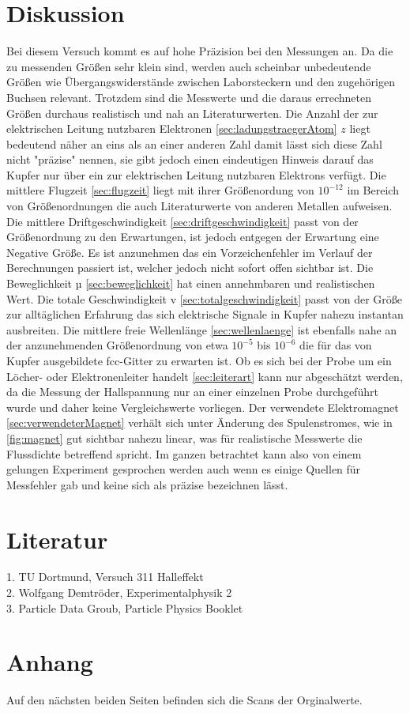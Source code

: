 \section{Diskussion}
\label{Diskussion}
Bei diesem Versuch kommt es auf hohe Präzision bei den Messungen an. Da die zu messenden Größen sehr 
klein sind, werden auch scheinbar unbedeutende Größen wie Übergangswiderstände zwischen Laborsteckern
und den zugehörigen Buchsen relevant. Trotzdem sind die Messwerte und die daraus errechneten Größen durchaus
realistisch und nah an Literaturwerten. Die Anzahl der zur elektrischen Leitung nutzbaren Elektronen 
\autoref{sec:ladungstraegerAtom} $z$ liegt bedeutend näher an eins als an einer anderen Zahl damit lässt 
sich diese Zahl nicht "präzise" nennen, sie gibt jedoch einen eindeutigen Hinweis darauf das Kupfer nur 
über ein zur elektrischen Leitung nutzbaren Elektrons verfügt. Die mittlere Flugzeit \autoref{sec:flugzeit}
liegt mit ihrer Größenordung von $10^{-12}$ im Bereich von Größenordnungen die auch Literaturwerte von 
anderen Metallen aufweisen. Die mittlere Driftgeschwindigkeit \autoref{sec:driftgeschwindigkeit} passt 
von der Größenordnung zu den Erwartungen, ist jedoch entgegen der Erwartung eine Negative Größe. Es ist 
anzunehmen das ein Vorzeichenfehler im Verlauf der Berechnungen passiert ist, welcher jedoch nicht sofort
offen sichtbar ist. Die Beweglichkeit µ \autoref{sec:beweglichkeit} hat einen annehmbaren und realistischen
Wert. Die totale Geschwindigkeit v \autoref{sec:totalgeschwindigkeit} passt von der Größe zur alltäglichen 
Erfahrung das sich elektrische Signale in Kupfer nahezu instantan ausbreiten. Die mittlere freie Wellenlänge
\autoref{sec:wellenlaenge} ist ebenfalls nahe an der anzunehmenden Größenordnung von etwa $10^{-5}$ bis 
$10^{-6}$ die für das von Kupfer ausgebildete fcc-Gitter zu erwarten ist. Ob es sich bei der Probe um ein
Löcher- oder Elektronenleiter handelt \autoref{sec:leiterart} kann nur abgeschätzt werden, da die Messung 
der Hallspannung nur an einer einzelnen Probe durchgeführt wurde und daher keine Vergleichswerte vorliegen.
Der verwendete Elektromagnet \autoref{sec:verwendeterMagnet} verhält sich unter Änderung des Spulenstromes, 
wie in \autoref{fig:magnet} gut sichtbar nahezu linear, was für realistische Messwerte die Flussdichte 
betreffend spricht. Im ganzen betrachtet kann also von einem gelungen Experiment gesprochen werden auch
wenn es einige Quellen für Messfehler gab und keine sich als präzise bezeichnen lässt.

\section{Literatur}
\label{Literatur}
1. TU Dortmund, Versuch 311 Halleffekt\\
2. Wolfgang Demtröder, Experimentalphysik 2\\
3. Particle Data Groub, Particle Physics Booklet

\section{Anhang}
\label{sec:Anhang}
Auf den nächsten beiden Seiten befinden sich die Scans der Orginalwerte. 